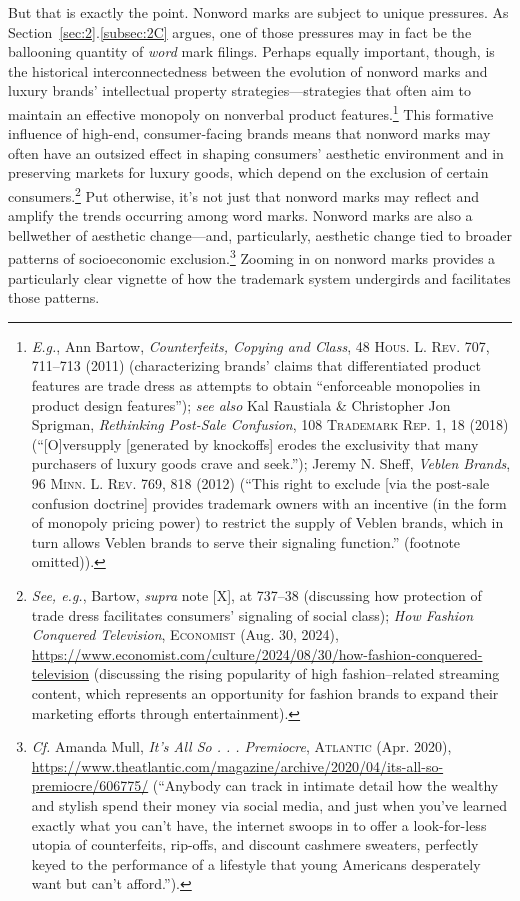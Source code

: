 \documentclass[letterpaper, 11pt, oneside]{article}
\begin{document}
But that is exactly the point. Nonword marks are subject to unique pressures. As Section~\ref{sec:2}.\ref{subsec:2C} argues, one of those pressures may in fact be the ballooning quantity of \textit{word} mark filings. Perhaps equally important, though, is the historical interconnectedness between the evolution of nonword marks and luxury brands' intellectual property strategies—strategies that often aim to maintain an effective monopoly on nonverbal product features.\footnote{\textit{E.g.}, Ann Bartow, \textit{Counterfeits, Copying and Class}, 48 \textsc{Hous. L. Rev.} 707, 711–713 (2011) (characterizing brands' claims that differentiated product features are trade dress as attempts to obtain ``enforceable monopolies in product design features''); \textit{see also} Kal Raustiala \& Christopher Jon Sprigman, \textit{Rethinking Post-Sale Confusion}, 108 \textsc{Trademark Rep.} 1, 18 (2018) (``[O]versupply [generated by knockoffs] erodes the exclusivity that many purchasers of luxury goods crave and seek.''); Jeremy N. Sheff, \textit{Veblen Brands}, 96 \textsc{Minn. L. Rev.} 769, 818 (2012) (``This right to exclude [via the post-sale confusion doctrine] provides trademark owners with an incentive (in the form of monopoly pricing power) to restrict the supply of Veblen brands, which in turn allows Veblen brands to serve their signaling function.'' (footnote omitted)).} This formative influence of high-end, consumer-facing brands means that nonword marks may often have an outsized effect in shaping consumers' aesthetic environment and in preserving markets for luxury goods, which depend on the exclusion of certain consumers.\footnote{\textit{See, e.g.}, Bartow, \textit{supra} note [X], at 737–38 (discussing how protection of trade dress facilitates consumers' signaling of social class); \textit{How Fashion Conquered Television}, \textsc{Economist} (Aug. 30, 2024), \url{https://www.economist.com/culture/2024/08/30/how-fashion-conquered-television} (discussing the rising popularity of high fashion–related streaming content, which represents an opportunity for fashion brands to expand their marketing efforts through entertainment).} Put otherwise, it's not just that nonword marks may reflect and amplify the trends occurring among word marks. Nonword marks are also a bellwether of aesthetic change—and, particularly, aesthetic change tied to broader patterns of socioeconomic exclusion.\footnote{\textit{Cf.} Amanda Mull, \textit{It's All So . . . Premiocre}, \textsc{Atlantic} (Apr. 2020), \url{https://www.theatlantic.com/magazine/archive/2020/04/its-all-so-premiocre/606775/} (``Anybody can track in intimate detail how the wealthy and stylish spend their money via social media, and just when you’ve learned exactly what you can’t have, the internet swoops in to offer a look-for-less utopia of counterfeits, rip-offs, and discount cashmere sweaters, perfectly keyed to the performance of a lifestyle that young Americans desperately want but can’t afford.'').} Zooming in on nonword marks provides a particularly clear vignette of how the trademark system undergirds and facilitates those patterns.
\end{document}
